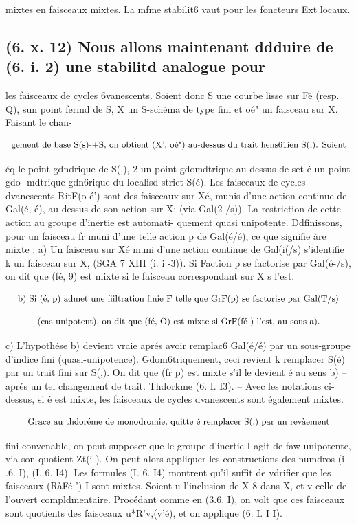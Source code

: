 \documentclass[11pt]{article}
\theoremstyle{remark}
\begin{document}
mixtes en faisceaux mixtes. La mfme stabilit6 vaut pour les foncteurs Ext locaux.

\subsection*{(6. x. 12) Nous allons maintenant ddduire de (6. i. 2) une stabilitd analogue pour}

les faisceaux de cycles 6vanescents. Soient donc S une courbe lisse sur Fé (resp. Q), sun point fermd de S, X un S-schéma de type fini et oé" un faisceau sur X. Faisant le chan-

\[\text{\small gement de base S(s)-+S, on obtient (X', oé") au-dessus du trait hens61ien S(,). Soient}\]

éq le point gdndrique de S(,), 2-un point gdomdtrique au-dessus de set é un point gdo- mdtrique gdn6rique du localisd strict S(é). Les faisceaux de cycles dvanescents RitF(o é') sont des faisceaux sur Xé, munis d'une action continue de Gal(é, é), au-dessus de son action sur X; (via Gal(2-/s)). La restriction de cette action au groupe d'inertie est automati- quement quasi unipotente. Ddfinissons, pour un faisceau fr muni d'une telle action p de Gal(é/é), ce que signifie àre mixte : a) Un faisceau sur Xé muni d'une action continue de Gal(i(/s) s'identifie k un faisceau sur X, (SGA 7 XIII (i. i -3)). Si Faction p se factorise par Gal(é-/s), on dit que (fé, 9) est mixte si le faisceau correspondant sur X s l'est.

\[\text{\small b) Si (é, p) admet une fiiltration finie F telle que GrF(p) se factorise par Gal(T/s)}\]

\[\text{\small (cas unipotent), on dit que (fé, O) est mixte si GrF(fé ) l'est, au sons a).}\]

c) L'hypothése b) devient vraie aprés avoir remplac6 Gal(é/é) par un sous-groupe d'indice fini (quasi-unipotence). Gdom6triquement, ceci revient k remplacer S(é) par un trait fini sur S(,). On dit que (fr p) est mixte s'il le devient é au sens b) -- aprés un tel changement de trait. Thdorkme (6. I. I3). -- Avec les notations ci-dessus, si é est mixte, les faisceaux de cycles dvanescents sont également mixtes.

\[\text{\small Grace au thdoréme de monodromie, quitte é remplacer S(,) par un revàement}\]

fini convenablc, on peut supposer que le groupe d'inertie I agit de faw unipotente, via son quotient Zt(i ). On peut alors appliquer les constructions des numdros (i .6. I), (I. 6. I4). Les formules (I. 6. I4) montrent qu'il suffit de vdrifier que les faisceaux (RàFé-') I sont mixtes. Soient u l'inclusion de X 8 dans X, et v celle de l'ouvert compldmentaire. Procédant comme en (3.6. I), on volt que ces faisceaux sont quotients des faisceaux u*R'v,(v'é), et on applique (6. I. I I).
\end{document}
